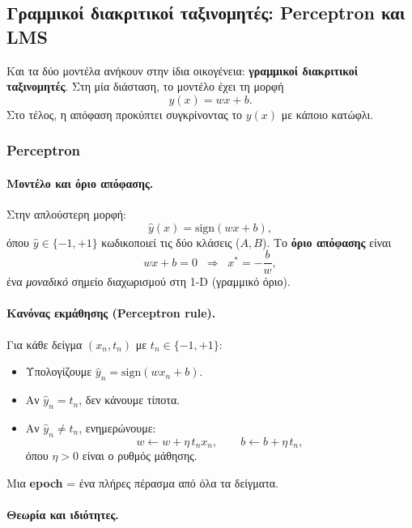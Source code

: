 \documentclass[a4paper,11pt]{article}
\begin{document}
\subsection{Γραμμικοί διακριτικοί ταξινομητές: Perceptron και LMS}

Και τα δύο μοντέλα ανήκουν στην ίδια οικογένεια: \textbf{γραμμικοί διακριτικοί ταξινομητές}.
Στη μία διάσταση, το μοντέλο έχει τη μορφή
\[
y(x) = w x + b.
\]
Στο τέλος, η απόφαση προκύπτει συγκρίνοντας το $y(x)$ με κάποιο κατώφλι.

\subsubsection*{Perceptron}

\paragraph{Μοντέλο και όριο απόφασης.}

Στην απλούστερη μορφή:
\[
\hat{y}(x) = \text{sign}(w x + b),
\]
όπου $\hat{y}\in\{-1,+1\}$ κωδικοποιεί τις δύο κλάσεις ($A,B$).
Το \textbf{όριο απόφασης} είναι
\[
w x + b = 0 \;\;\Rightarrow\;\; x^\ast = -\frac{b}{w},
\]
ένα \emph{μοναδικό} σημείο διαχωρισμού στη 1-D (γραμμικό όριο).

\paragraph{Κανόνας εκμάθησης (Perceptron rule).}

Για κάθε δείγμα $(x_n,t_n)$ με $t_n\in\{-1,+1\}$:
\begin{itemize}
  \item Υπολογίζουμε $\hat{y}_n = \text{sign}(w x_n + b)$.
  \item Αν $\hat{y}_n = t_n$, δεν κάνουμε τίποτα.
  \item Αν $\hat{y}_n \neq t_n$, ενημερώνουμε:
        \[
          w \leftarrow w + \eta\, t_n x_n, \qquad
          b \leftarrow b + \eta\, t_n,
        \]
        όπου $\eta>0$ είναι ο ρυθμός μάθησης.
\end{itemize}

Μια \textbf{epoch} = ένα πλήρες πέρασμα από όλα τα δείγματα.

\paragraph{Θεωρία και ιδιότητες.}
\end{document}
